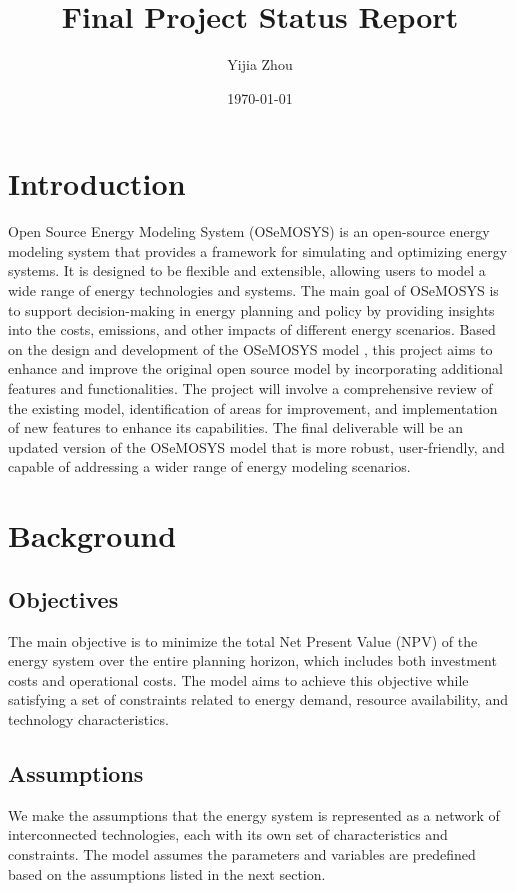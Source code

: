 \documentclass[11pt]{article}
\title{Final Project Status Report}
\author{Yijia Zhou}
\date{\today}
\begin{document}
\maketitle


\section{Introduction}
Open Source Energy Modeling System (OSeMOSYS) is an open-source energy modeling system that provides a framework for simulating and optimizing energy systems. It is designed to be flexible and extensible, allowing users to model a wide range of energy technologies and systems. The main goal of OSeMOSYS is to support decision-making in energy planning and policy by providing insights into the costs, emissions, and other impacts of different energy scenarios. Based on the design and development of the OSeMOSYS model \cite{Howells2011}, this project aims to enhance and improve the original open source model by incorporating additional features and functionalities. The project will involve a comprehensive review of the existing model, identification of areas for improvement, and implementation of new features to enhance its capabilities. The final deliverable will be an updated version of the OSeMOSYS model that is more robust, user-friendly, and capable of addressing a wider range of energy modeling scenarios.

\section{Background}
\subsection{Objectives}
The main objective is to minimize the total Net Present Value (NPV) of the energy system over the entire planning horizon, which includes both investment costs and operational costs. The model aims to achieve this objective while satisfying a set of constraints related to energy demand, resource availability, and technology characteristics.

\subsection{Assumptions}
We make the assumptions that the energy system is represented as a network of interconnected technologies, each with its own set of characteristics and constraints. The model assumes the parameters and variables are predefined based on the assumptions listed in the next section.
\end{document}
